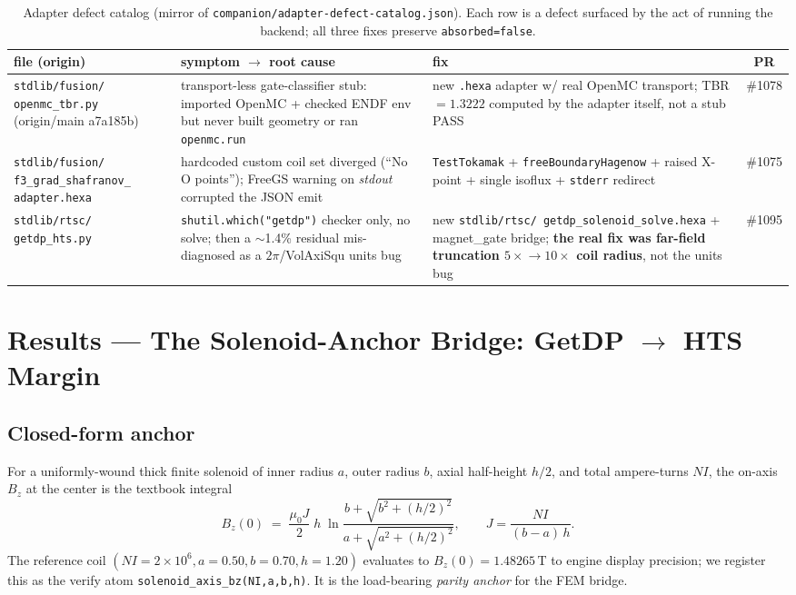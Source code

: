 \documentclass[11pt,a4paper]{article}
\begin{document}
\begin{table}[h]
\centering
\scriptsize
\begin{tabular}{@{}>{\raggedright\arraybackslash}m{2.7cm} >{\raggedright\arraybackslash}m{4.0cm} >{\raggedright\arraybackslash}m{4.4cm} c@{}}
\toprule
\textbf{file (origin)} & \textbf{symptom $\to$ root cause} & \textbf{fix} & \textbf{PR} \\
\midrule
\texttt{stdlib/fusion/ openmc\_tbr.py} (origin/main a7a185b)
  & transport-less gate-classifier stub: imported OpenMC + checked ENDF env but never built geometry or ran \texttt{openmc.run}
  & new \texttt{.hexa} adapter w/ real OpenMC transport; TBR$=1.3222$ computed by the adapter itself, not a stub PASS
  & \#1078 \\[2pt]
\texttt{stdlib/fusion/ f3\_grad\_shafranov\_ adapter.hexa}
  & hardcoded custom coil set diverged (``No O points''); FreeGS warning on \emph{stdout} corrupted the JSON emit
  & \texttt{TestTokamak} + \texttt{freeBoundaryHagenow} + raised X-point + single isoflux + \texttt{stderr} redirect
  & \#1075 \\[2pt]
\texttt{stdlib/rtsc/ getdp\_hts.py}
  & \texttt{shutil.which("getdp")} checker only, no solve; then a $\sim$1.4\% residual mis-diagnosed as a $2\pi$/VolAxiSqu units bug
  & new \texttt{stdlib/rtsc/ getdp\_solenoid\_solve.hexa} + magnet\_gate bridge; \textbf{the real fix was far-field truncation $5\times\!\to\!10\times$ coil radius}, not the units bug
  & \#1095 \\
\bottomrule
\end{tabular}
\caption{Adapter defect catalog (mirror of
\texttt{companion/adapter-defect-catalog.json}). Each row is a defect
surfaced by the act of running the backend; all three fixes preserve
\texttt{absorbed=false}.}
\label{tab:defects}
\end{table}

\section{Results --- The Solenoid-Anchor Bridge: GetDP $\to$ HTS Margin}
\label{sec:bridge}

\subsection{Closed-form anchor}

For a uniformly-wound thick finite solenoid of inner radius $a$,
outer radius $b$, axial half-height $h/2$, and total ampere-turns
$NI$, the on-axis $B_z$ at the center is the textbook integral
\begin{equation}
B_z(0) \;=\; \frac{\mu_0 J}{2}\;h\;\ln\!\frac{b + \sqrt{b^{2} + (h/2)^{2}}}{a + \sqrt{a^{2} + (h/2)^{2}}},
\qquad J = \frac{NI}{(b-a)\,h}.
\label{eq:solenoid}
\end{equation}
The reference coil $(NI=2\!\times\!10^{6}, a=0.50, b=0.70, h=1.20)$
evaluates to $B_z(0) = 1.48265$\,T to engine display precision; we
register this as the verify atom
\verb|solenoid_axis_bz(NI,a,b,h)|. It is the load-bearing
\emph{parity anchor} for the FEM bridge.
\end{document}
